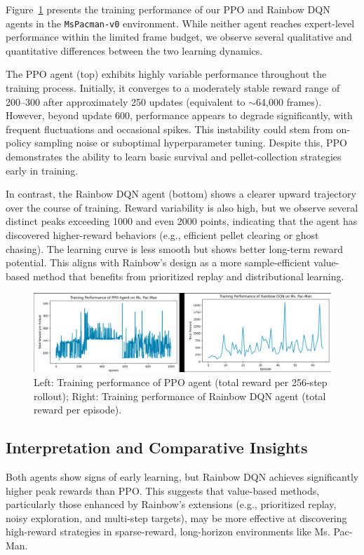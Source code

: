 \documentclass{article}
\begin{document}
Figure~\ref{fig:ppo_vs_rainbow} presents the training performance of our PPO and Rainbow DQN agents in the \texttt{MsPacman-v0} environment. While neither agent reaches expert-level performance within the limited frame budget, we observe several qualitative and quantitative differences between the two learning dynamics.

The PPO agent (top) exhibits highly variable performance throughout the training process. Initially, it converges to a moderately stable reward range of 200–300 after approximately 250 updates (equivalent to $\sim$64,000 frames). However, beyond update 600, performance appears to degrade significantly, with frequent fluctuations and occasional spikes. This instability could stem from on-policy sampling noise or suboptimal hyperparameter tuning. Despite this, PPO demonstrates the ability to learn basic survival and pellet-collection strategies early in training.

In contrast, the Rainbow DQN agent (bottom) shows a clearer upward trajectory over the course of training. Reward variability is also high, but we observe several distinct peaks exceeding 1000 and even 2000 points, indicating that the agent has discovered higher-reward behaviors (e.g., efficient pellet clearing or ghost chasing). The learning curve is less smooth but shows better long-term reward potential. This aligns with Rainbow’s design as a more sample-efficient value-based method that benefits from prioritized replay and distributional learning.

\begin{figure}[h]
    \centering
    \includegraphics[width=0.85\linewidth]{rainbow_vs_ppo.png}
    \caption{Left: Training performance of PPO agent (total reward per 256-step rollout); Right: Training performance of Rainbow DQN agent (total reward per episode).}
    \label{fig:ppo_vs_rainbow}
\end{figure}

\subsection{Interpretation and Comparative Insights}

Both agents show signs of early learning, but Rainbow DQN achieves significantly higher peak rewards than PPO. This suggests that value-based methods, particularly those enhanced by Rainbow’s extensions (e.g., prioritized replay, noisy exploration, and multi-step targets), may be more effective at discovering high-reward strategies in sparse-reward, long-horizon environments like Ms. Pac-Man.
\end{document}
